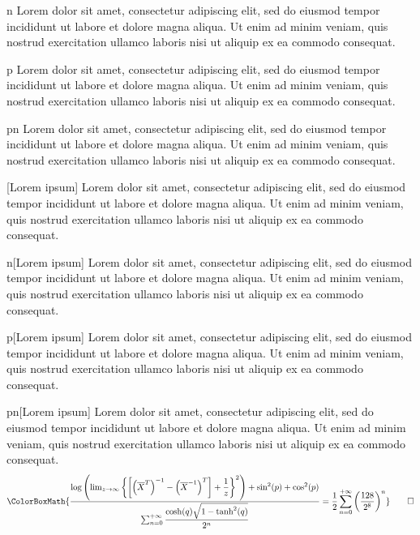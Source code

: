 \begin{remark}{n}
	Lorem dolor sit amet, consectetur adipiscing elit, sed do eiusmod tempor incididunt ut labore et dolore magna aliqua. Ut enim ad minim veniam, quis nostrud exercitation ullamco laboris nisi ut aliquip ex ea commodo consequat.
\end{remark}

\begin{remark}{p}
	Lorem dolor sit amet, consectetur adipiscing elit, sed do eiusmod tempor incididunt ut labore et dolore magna aliqua. Ut enim ad minim veniam, quis nostrud exercitation ullamco laboris nisi ut aliquip ex ea commodo consequat.
\end{remark}

\begin{remark}{pn}
	Lorem dolor sit amet, consectetur adipiscing elit, sed do eiusmod tempor incididunt ut labore et dolore magna aliqua. Ut enim ad minim veniam, quis nostrud exercitation ullamco laboris nisi ut aliquip ex ea commodo consequat.
\end{remark}

\begin{remark}{}[Lorem ipsum]
	Lorem dolor sit amet, consectetur adipiscing elit, sed do eiusmod tempor incididunt ut labore et dolore magna aliqua. Ut enim ad minim veniam, quis nostrud exercitation ullamco laboris nisi ut aliquip ex ea commodo consequat.
\end{remark}

\begin{remark}{n}[Lorem ipsum]
	Lorem dolor sit amet, consectetur adipiscing elit, sed do eiusmod tempor incididunt ut labore et dolore magna aliqua. Ut enim ad minim veniam, quis nostrud exercitation ullamco laboris nisi ut aliquip ex ea commodo consequat.
\end{remark}

\begin{remark}{p}[Lorem ipsum]
	Lorem dolor sit amet, consectetur adipiscing elit, sed do eiusmod tempor incididunt ut labore et dolore magna aliqua. Ut enim ad minim veniam, quis nostrud exercitation ullamco laboris nisi ut aliquip ex ea commodo consequat.
\end{remark}

\begin{remark}{pn}[Lorem ipsum]
	Lorem dolor sit amet, consectetur adipiscing elit, sed do eiusmod tempor incididunt ut labore et dolore magna aliqua. Ut enim ad minim veniam, quis nostrud exercitation ullamco laboris nisi ut aliquip ex ea commodo consequat.
	\begin{equation*}
		\ColorBoxMath{\dfrac{\log\left(\lim_{z\to\infty}\left\{\left[\left(\overline{X}^{T}\right)^{-1}-\left(\overline{X}^{-1}\right)^T\right]+\dfrac{1}{z}\right\}^2\right)+\sin^2(p)+\cos^2(p)}{\sum_{n=0}^{+\infty}\dfrac{\cosh(q)\sqrt{1-\tanh^2(q)}}{2^n}}=\dfrac{1}{2}\sum_{n=0}^{+\infty}\left(\dfrac{128}{2^8}\right)^n}\qedhere
	\end{equation*}
\end{remark}

